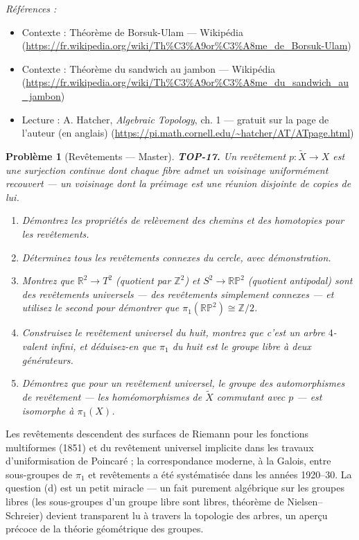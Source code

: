 \documentclass[11pt]{article}
\newtheorem{problem}{Problème}
\newenvironment{refs}{\par\small\noindent\emph{Références :}\begin{itemize}\setlength\itemsep{0pt}}{\end{itemize}\normalsize}
\begin{document}
\begin{refs}
\item Contexte : Théorème de Borsuk-Ulam --- Wikipédia (\url{https://fr.wikipedia.org/wiki/Th%C3%A9or%C3%A8me_de_Borsuk-Ulam})
\item Contexte : Théorème du sandwich au jambon --- Wikipédia (\url{https://fr.wikipedia.org/wiki/Th%C3%A9or%C3%A8me_du_sandwich_au_jambon})
\item Lecture : A. Hatcher, \textit{Algebraic Topology}, ch. 1 --- gratuit sur la page de l'auteur (en anglais) (\url{https://pi.math.cornell.edu/~hatcher/AT/ATpage.html})
\end{refs}

\bigskip

\begin{problem}[{Revêtements --- Master}]
\textbf{TOP-17.} Un revêtement $ p : \tilde{X} \to X $ est une surjection continue dont chaque
fibre admet un voisinage uniformément recouvert --- un voisinage dont la préimage est une réunion
disjointe de copies de lui.
\begin{enumerate}
\item[(a)] Démontrez les propriétés de relèvement des chemins et des homotopies pour les
revêtements.
\item[(b)] Déterminez tous les revêtements connexes du cercle, avec démonstration.
\item[(c)] Montrez que $ \mathbb{R}^2 \to T^2 $ (quotient par $ \mathbb{Z}^2 $) et
$ S^2 \to \mathbb{RP}^2 $ (quotient antipodal) sont des revêtements universels --- des revêtements
simplement connexes --- et utilisez le second pour démontrer que
$ \pi_1(\mathbb{RP}^2) \cong \mathbb{Z}/2 $.
\item[(d)] Construisez le revêtement universel du huit, montrez que c'est un arbre $ 4 $-valent infini, et
déduisez-en que $ \pi_1 $ du huit est le groupe libre à deux générateurs.
\item[(e)] Démontrez que pour un revêtement universel, le groupe des automorphismes de revêtement --- les
homéomorphismes de $ \tilde{X} $ commutant avec $ p $ --- est isomorphe à $ \pi_1(X) $.
\end{enumerate}

\end{problem}

\noindent Les revêtements descendent des surfaces de Riemann pour les fonctions multiformes
(1851) et du revêtement universel implicite dans les travaux d'uniformisation de Poincaré ; la
correspondance moderne, à la Galois, entre sous-groupes de $ \pi_1 $ et revêtements a été systématisée
dans les années 1920--30. La question (d) est un petit miracle --- un fait purement algébrique sur les
groupes libres (les sous-groupes d'un groupe libre sont libres, théorème de Nielsen--Schreier) devient
transparent lu à travers la topologie des arbres, un aperçu précoce de la théorie géométrique des
groupes.
\end{document}
